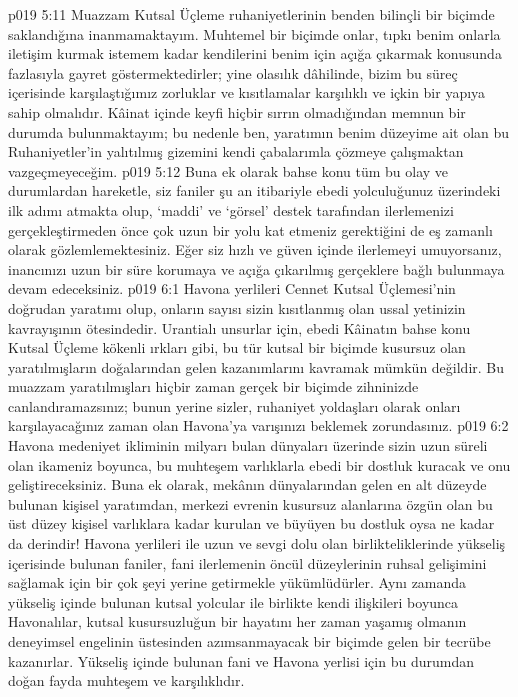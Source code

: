 \vs p019 5:11 Muazzam Kutsal Üçleme ruhaniyetlerinin benden bilinçli bir biçimde saklandığına inanmamaktayım. Muhtemel bir biçimde onlar, tıpkı benim onlarla iletişim kurmak istemem kadar kendilerini benim için açığa çıkarmak konusunda fazlasıyla gayret göstermektedirler; yine olasılık dâhilinde, bizim bu süreç içerisinde karşılaştığımız zorluklar ve kısıtlamalar karşılıklı ve içkin bir yapıya sahip olmalıdır. Kâinat içinde keyfi hiçbir sırrın olmadığından memnun bir durumda bulunmaktayım; bu nedenle ben, yaratımın benim düzeyime ait olan bu Ruhaniyetler’in yalıtılmış gizemini kendi çabalarımla çözmeye çalışmaktan vazgeçmeyeceğim.
\vs p019 5:12 Buna ek olarak bahse konu tüm bu olay ve durumlardan hareketle, siz faniler şu an itibariyle ebedi yolculuğunuz üzerindeki ilk adımı atmakta olup, ‘maddi’ ve ‘görsel’ destek tarafından ilerlemenizi gerçekleştirmeden önce çok uzun bir yolu kat etmeniz gerektiğini de eş zamanlı olarak gözlemlemektesiniz. Eğer siz hızlı ve güven içinde ilerlemeyi umuyorsanız, inancınızı uzun bir süre korumaya ve açığa çıkarılmış gerçeklere bağlı bulunmaya devam edeceksiniz.
\vs p019 6:1 Havona yerlileri Cennet Kutsal Üçlemesi’nin doğrudan yaratımı olup, onların sayısı sizin kısıtlanmış olan ussal yetinizin kavrayışının ötesindedir. Urantialı unsurlar için, ebedi Kâinatın bahse konu Kutsal Üçleme kökenli ırkları gibi, bu tür kutsal bir biçimde kusursuz olan yaratılmışların doğalarından gelen kazanımlarını kavramak mümkün değildir. Bu muazzam yaratılmışları hiçbir zaman gerçek bir biçimde zihninizde canlandıramazsınız; bunun yerine sizler, ruhaniyet yoldaşları olarak onları karşılayacağınız zaman olan Havona’ya varışınızı beklemek zorundasınız.
\vs p019 6:2 Havona medeniyet ikliminin milyarı bulan dünyaları üzerinde sizin uzun süreli olan ikameniz boyunca, bu muhteşem varlıklarla ebedi bir dostluk kuracak ve onu geliştireceksiniz. Buna ek olarak, mekânın dünyalarından gelen en alt düzeyde bulunan kişisel yaratımdan, merkezi evrenin kusursuz alanlarına özgün olan bu üst düzey kişisel varlıklara kadar kurulan ve büyüyen bu dostluk oysa ne kadar da derindir! Havona yerlileri ile uzun ve sevgi dolu olan birlikteliklerinde yükseliş içerisinde bulunan faniler, fani ilerlemenin öncül düzeylerinin ruhsal gelişimini sağlamak için bir çok şeyi yerine getirmekle yükümlüdürler. Aynı zamanda yükseliş içinde bulunan kutsal yolcular ile birlikte kendi ilişkileri boyunca Havonalılar, kutsal kusursuzluğun bir hayatını her zaman yaşamış olmanın deneyimsel engelinin üstesinden azımsanmayacak bir biçimde gelen bir tecrübe kazanırlar. Yükseliş içinde bulunan fani ve Havona yerlisi için bu durumdan doğan fayda muhteşem ve karşılıklıdır.
